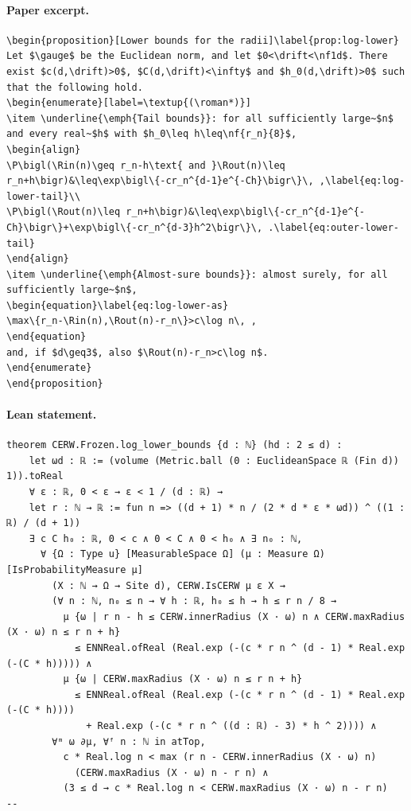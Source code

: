 \paragraph{Paper excerpt.}
\begin{verbatim}
\begin{proposition}[Lower bounds for the radii]\label{prop:log-lower}
Let $\gauge$ be the Euclidean norm, and let $0<\drift<\nf1d$. There exist $c(d,\drift)>0$, $C(d,\drift)<\infty$ and $h_0(d,\drift)>0$ such that the following hold.
\begin{enumerate}[label=\textup{(\roman*)}]
\item \underline{\emph{Tail bounds}}: for all sufficiently large~$n$ and every real~$h$ with $h_0\leq h\leq\nf{r_n}{8}$,
\begin{align}
\P\bigl(\Rin(n)\geq r_n-h\text{ and }\Rout(n)\leq r_n+h\bigr)&\leq\exp\bigl\{-cr_n^{d-1}e^{-Ch}\bigr\}\, ,\label{eq:log-lower-tail}\\
\P\bigl(\Rout(n)\leq r_n+h\bigr)&\leq\exp\bigl\{-cr_n^{d-1}e^{-Ch}\bigr\}+\exp\bigl\{-cr_n^{d-3}h^2\bigr\}\, .\label{eq:outer-lower-tail}
\end{align}
\item \underline{\emph{Almost-sure bounds}}: almost surely, for all sufficiently large~$n$,
\begin{equation}\label{eq:log-lower-as}
\max\{r_n-\Rin(n),\Rout(n)-r_n\}>c\log n\, ,
\end{equation}
and, if $d\geq3$, also $\Rout(n)-r_n>c\log n$.
\end{enumerate}
\end{proposition}
\end{verbatim}
\paragraph{Lean statement.}
\begin{verbatim}
theorem CERW.Frozen.log_lower_bounds {d : ℕ} (hd : 2 ≤ d) :
    let ωd : ℝ := (volume (Metric.ball (0 : EuclideanSpace ℝ (Fin d)) 1)).toReal
    ∀ ε : ℝ, 0 < ε → ε < 1 / (d : ℝ) →
    let r : ℕ → ℝ := fun n => ((d + 1) * n / (2 * d * ε * ωd)) ^ ((1 : ℝ) / (d + 1))
    ∃ c C h₀ : ℝ, 0 < c ∧ 0 < C ∧ 0 < h₀ ∧ ∃ n₀ : ℕ,
      ∀ {Ω : Type u} [MeasurableSpace Ω] (μ : Measure Ω) [IsProbabilityMeasure μ]
        (X : ℕ → Ω → Site d), CERW.IsCERW μ ε X →
        (∀ n : ℕ, n₀ ≤ n → ∀ h : ℝ, h₀ ≤ h → h ≤ r n / 8 →
          μ {ω | r n - h ≤ CERW.innerRadius (X · ω) n ∧ CERW.maxRadius (X · ω) n ≤ r n + h}
            ≤ ENNReal.ofReal (Real.exp (-(c * r n ^ (d - 1) * Real.exp (-(C * h))))) ∧
          μ {ω | CERW.maxRadius (X · ω) n ≤ r n + h}
            ≤ ENNReal.ofReal (Real.exp (-(c * r n ^ (d - 1) * Real.exp (-(C * h))))
              + Real.exp (-(c * r n ^ ((d : ℝ) - 3) * h ^ 2)))) ∧
        ∀ᵐ ω ∂μ, ∀ᶠ n : ℕ in atTop,
          c * Real.log n < max (r n - CERW.innerRadius (X · ω) n)
            (CERW.maxRadius (X · ω) n - r n) ∧
          (3 ≤ d → c * Real.log n < CERW.maxRadius (X · ω) n - r n)
--
\end{verbatim}
